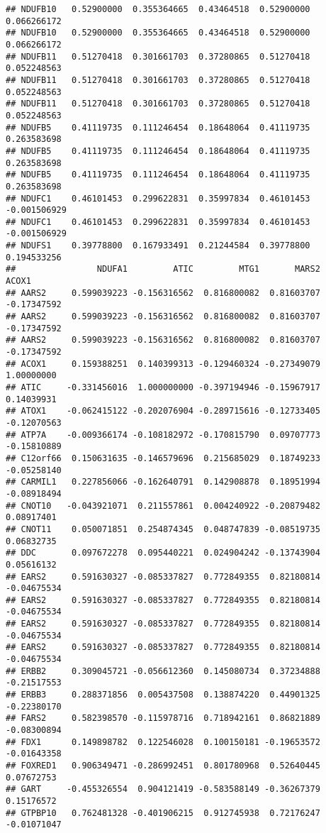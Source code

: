 \documentclass[
]{article}
\begin{document}
\begin{verbatim}
## NDUFB10   0.52900000  0.355364665  0.43464518  0.52900000  0.066266172
## NDUFB10   0.52900000  0.355364665  0.43464518  0.52900000  0.066266172
## NDUFB11   0.51270418  0.301661703  0.37280865  0.51270418  0.052248563
## NDUFB11   0.51270418  0.301661703  0.37280865  0.51270418  0.052248563
## NDUFB11   0.51270418  0.301661703  0.37280865  0.51270418  0.052248563
## NDUFB5    0.41119735  0.111246454  0.18648064  0.41119735  0.263583698
## NDUFB5    0.41119735  0.111246454  0.18648064  0.41119735  0.263583698
## NDUFB5    0.41119735  0.111246454  0.18648064  0.41119735  0.263583698
## NDUFC1    0.46101453  0.299622831  0.35997834  0.46101453 -0.001506929
## NDUFC1    0.46101453  0.299622831  0.35997834  0.46101453 -0.001506929
## NDUFS1    0.39778800  0.167933491  0.21244584  0.39778800  0.194533256
##                NDUFA1         ATIC         MTG1       MARS2       ACOX1
## AARS2     0.599039223 -0.156316562  0.816800082  0.81603707 -0.17347592
## AARS2     0.599039223 -0.156316562  0.816800082  0.81603707 -0.17347592
## AARS2     0.599039223 -0.156316562  0.816800082  0.81603707 -0.17347592
## ACOX1     0.159388251  0.140399313 -0.129460324 -0.27349079  1.00000000
## ATIC     -0.331456016  1.000000000 -0.397194946 -0.15967917  0.14039931
## ATOX1    -0.062415122 -0.202076904 -0.289715616 -0.12733405 -0.12070563
## ATP7A    -0.009366174 -0.108182972 -0.170815790  0.09707773 -0.15810889
## C12orf66  0.150631635 -0.146579696  0.215685029  0.18749233 -0.05258140
## CARMIL1   0.227856066 -0.162640791  0.142908878  0.18951994 -0.08918494
## CNOT10   -0.043921071  0.211557861  0.004240922 -0.20879482  0.08917401
## CNOT11    0.050071851  0.254874345  0.048747839 -0.08519735  0.06832735
## DDC       0.097672278  0.095440221  0.024904242 -0.13743904  0.05616132
## EARS2     0.591630327 -0.085337827  0.772849355  0.82180814 -0.04675534
## EARS2     0.591630327 -0.085337827  0.772849355  0.82180814 -0.04675534
## EARS2     0.591630327 -0.085337827  0.772849355  0.82180814 -0.04675534
## EARS2     0.591630327 -0.085337827  0.772849355  0.82180814 -0.04675534
## ERBB2     0.309045721 -0.056612360  0.145080734  0.37234888 -0.21517553
## ERBB3     0.288371856  0.005437508  0.138874220  0.44901325 -0.22380170
## FARS2     0.582398570 -0.115978716  0.718942161  0.86821889 -0.08300894
## FDX1      0.149898782  0.122546028  0.100150181 -0.19653572 -0.01643358
## FOXRED1   0.906349471 -0.286992451  0.801780968  0.52640445  0.07672753
## GART     -0.455326554  0.904121419 -0.583588149 -0.36267379  0.15176572
## GTPBP10   0.762481328 -0.401906215  0.912745938  0.72176247 -0.01071047

\end{verbatim}
\end{document}
